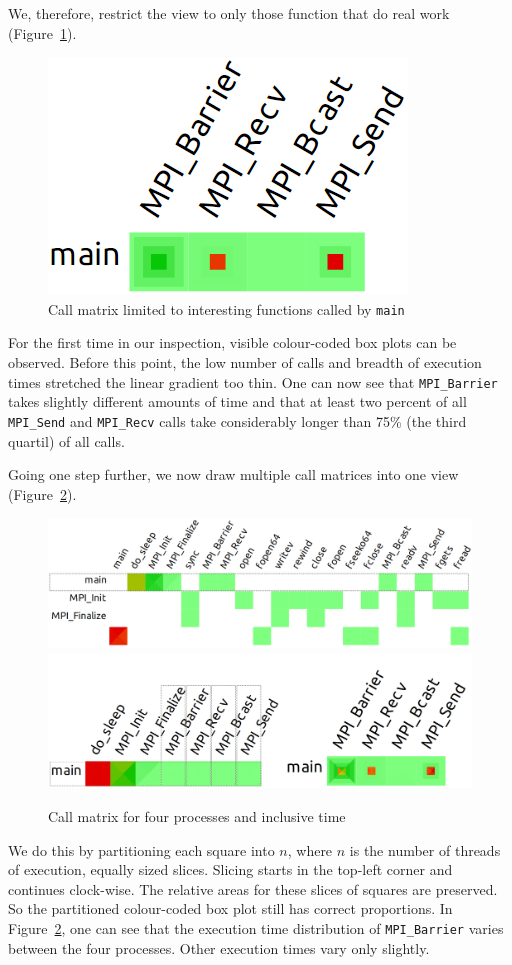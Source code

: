 \documentclass[b5paper, final, hauptseminar]{zih-template}
\begin{document}
We, therefore, restrict the view to only those function that do real work (Figure~\ref{fig:id-m-pp-1-3}).
\begin{figure}[htbp]
	\centering
	\includegraphics[width=0.4\linewidth]{id-m-pp-1-3}
	\caption{Call matrix limited to interesting functions called by \texttt{main}}
	\label{fig:id-m-pp-1-3}
\end{figure}
For the first time in our inspection, visible colour-coded box plots can be observed. Before this point, the low number of calls and breadth of execution times stretched the linear gradient too thin.
One can now see that \texttt{MPI\_Barrier} takes slightly different amounts of time and
that at least two percent of all \texttt{MPI\_Send} and \texttt{MPI\_Recv} calls take considerably longer than 75\% (the third quartil) of all calls.

Going one step further, we now draw multiple call matrices into one view (Figure~\ref{fig:id-m-pp-4}).
\begin{figure}[htbp]
	\centering
	\includegraphics[width=0.8\linewidth]{id-m-pp-4-1}
	\includegraphics[width=0.8\linewidth]{id-m-pp-4-2}
	\caption{Call matrix for four processes and inclusive time}
	\label{fig:id-m-pp-4}
\end{figure}
We do this by partitioning each square into $n$, where $n$ is the number of threads of execution, equally sized slices. Slicing starts in the top-left corner and continues clock-wise.
The relative areas for these slices of squares are preserved. So the partitioned colour-coded box plot still has correct proportions.
In Figure~\ref{fig:id-m-pp-4}, one can see that the execution time distribution of \texttt{MPI\_Barrier} varies between the four processes.
Other execution times vary only slightly.
\end{document}
